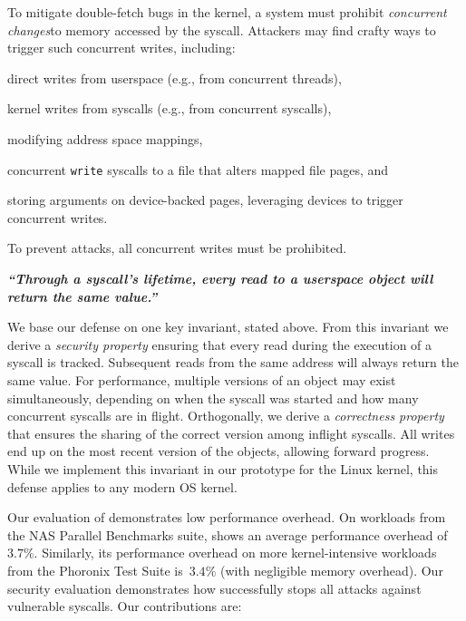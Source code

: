 To mitigate double-fetch bugs in the kernel, a system must prohibit
\emph{concurrent changes}\footnotemark to memory accessed by the syscall. Attackers may
find crafty ways to trigger such concurrent writes, including:
\begin{inparaenum}
\item  direct writes from userspace (e.g., from concurrent threads),
\item  kernel writes from syscalls (e.g., from concurrent syscalls),
\item  modifying address space mappings,
\item  concurrent \texttt{write} syscalls to a file that alters mapped
file pages, and
\item  storing arguments on device-backed pages, leveraging devices to trigger
concurrent writes.
\end{inparaenum}
To prevent attacks, all concurrent writes must be prohibited.

\begin{center}
  \textbf{\emph{``Through a syscall's lifetime, every read to a userspace object
  will return the same value.''}}
\end{center}
We base our defense on one key invariant, stated above. 
From this invariant we derive a \emph{security
property} ensuring that every read during the execution of a syscall is
tracked. Subsequent reads from the same address will always return the same value.
For performance, multiple versions of an object may exist simultaneously,
depending on when the syscall was started and how many
concurrent syscalls are in flight. 
Orthogonally, we derive a \emph{correctness
property} that ensures the sharing of the correct version among inflight
syscalls. All writes end up on the most recent version of
the objects, allowing forward progress.
While we implement this invariant in our \midas prototype for the Linux kernel,
this defense applies to any modern OS kernel.

Our evaluation of \midas demonstrates low performance overhead.
On workloads from the NAS Parallel Benchmarks suite, \midas shows
an average performance overhead of~$3.7\%$. Similarly, its performance overhead on
more kernel-intensive workloads from the Phoronix Test Suite is~$3.4\%$ (with
negligible memory overhead).
%
Our security evaluation demonstrates how \midas successfully stops all attacks
against vulnerable syscalls.
%
Our contributions are:

